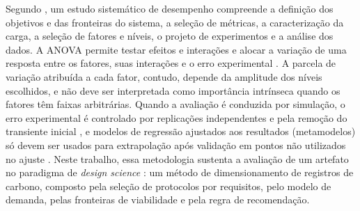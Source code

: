 Segundo \citet{Jain1991}, um estudo sistemático de desempenho compreende a definição dos objetivos e das fronteiras do sistema, a seleção de métricas, a caracterização da carga, a seleção de fatores e níveis, o projeto de experimentos e a análise dos dados. A ANOVA permite testar efeitos e interações e alocar a variação de uma resposta entre os fatores, suas interações e o erro experimental \citep{Jain1991,Montgomery2017}. A parcela de variação atribuída a cada fator, contudo, depende da amplitude dos níveis escolhidos, e não deve ser interpretada como importância intrínseca quando os fatores têm faixas arbitrárias. Quando a avaliação é conduzida por simulação, o erro experimental é controlado por replicações independentes e pela remoção do transiente inicial \citep{Law2015}, e modelos de regressão ajustados aos resultados (metamodelos) só devem ser usados para extrapolação após validação em pontos não utilizados no ajuste \citep{Kleijnen2015}. Neste trabalho, essa metodologia sustenta a avaliação de um artefato no paradigma de \textit{design science} \citep{Hevner2004}: um método de dimensionamento de registros de carbono, composto pela seleção de protocolos por requisitos, pelo modelo de demanda, pelas fronteiras de viabilidade e pela regra de recomendação.
